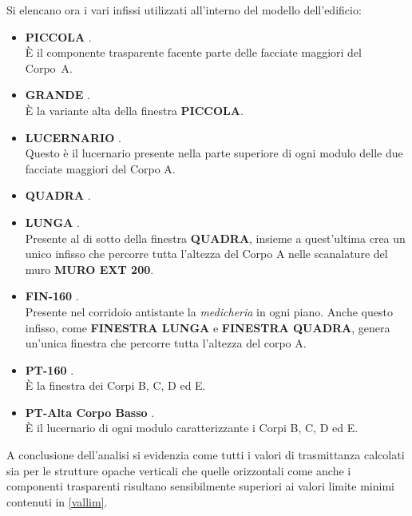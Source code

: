 Si elencano ora i vari infissi utilizzati all'interno del modello dell'edificio:
\begin{itemize}
	\item \textbf{PICCOLA} .\\ È il componente trasparente facente parte delle facciate maggiori del Corpo~A. 
	\item \textbf{GRANDE} .\\ È la variante alta della finestra \textbf{PICCOLA}. 
	\item \textbf{LUCERNARIO} .\\ Questo è il lucernario presente nella parte superiore di ogni modulo delle due facciate maggiori del Corpo A. 
	\item \textbf{QUADRA} .
	\item \textbf{LUNGA} .\\ Presente al di sotto della finestra \textbf{QUADRA}, insieme a quest'ultima crea un unico infisso che percorre tutta l'altezza del Corpo A nelle scanalature del muro \textbf{MURO EXT 200}. 
	\item \textbf{FIN-160} . \\ Presente nel corridoio antistante la \emph{medicheria} in ogni piano. Anche questo infisso, come \textbf{FINESTRA LUNGA} e \textbf{FINESTRA QUADRA}, genera un'unica finestra che percorre tutta l'altezza del corpo A.
	\item \textbf{PT-160} . \\ È la finestra dei Corpi B, C, D ed E. 
	\item \textbf{PT-Alta Corpo Basso} .\\ È il lucernario di ogni modulo caratterizzante i Corpi B, C, D ed E. 
\end{itemize}

A conclusione dell'analisi si evidenzia come tutti i valori di trasmittanza calcolati sia per le strutture opache verticali che quelle orizzontali come anche i componenti trasparenti risultano sensibilmente superiori ai valori limite minimi contenuti in \ref{vallim}.

